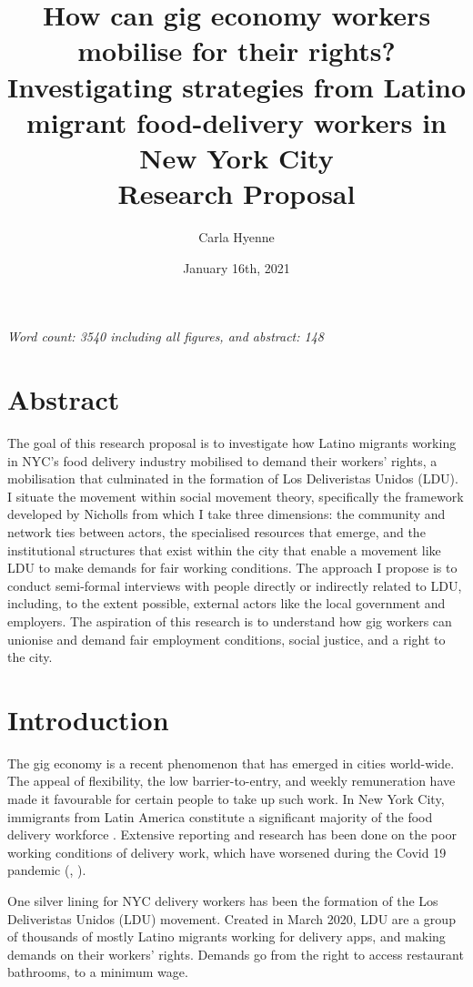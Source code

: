 \documentclass{article}[12pt]
\title{How can gig economy workers mobilise for their rights? Investigating strategies from Latino migrant food-delivery workers in New York City \\[5ex]Research Proposal \\[3ex]}
\author{Carla Hyenne}
\date{January 16th, 2021}
\begin{document}
\maketitle

\textit{Word count: 3540 including all figures, and abstract: 148}

\section{Abstract}

The goal of this research proposal is to investigate how Latino migrants working in NYC’s food delivery industry mobilised to demand their workers’ rights, a mobilisation that culminated in the formation of Los Deliveristas Unidos (LDU).
I situate the movement within social movement theory, specifically the framework developed by Nicholls from which I take three dimensions: the community and network ties between actors, the specialised resources that emerge, and the institutional structures that exist within the city that enable a movement like LDU to make demands for fair working conditions.
The approach I propose is to conduct semi-formal interviews with people directly or indirectly related to LDU, including, to the extent possible, external actors like the local government and employers.
The aspiration of this research is to understand how gig workers can unionise and demand fair employment conditions, social justice, and a right to the city.

\pagebreak


\section{Introduction}

The gig economy is a recent phenomenon that has emerged in cities world-wide. The appeal of flexibility, the low barrier-to-entry, and weekly remuneration have made it favourable for certain people to take up such work. In New York City, immigrants from Latin America constitute a significant majority of the food delivery workforce \parencite{ldu_report2021}. Extensive reporting and research has been done on the poor working conditions of delivery work, which have worsened during the Covid 19 pandemic (\parencite{newyorker2020uncertain}, \parencite{nytimes2021risk}).

One silver lining for NYC delivery workers has been the formation of the Los Deliveristas Unidos (LDU) movement. Created in March 2020, LDU are a group of thousands of mostly Latino migrants working for delivery apps, and making demands on their workers’ rights. Demands go from the right to access restaurant bathrooms, to a minimum wage. 
\end{document}
